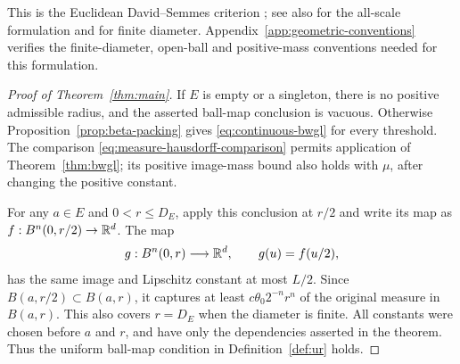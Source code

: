 This is the Euclidean David--Semmes criterion
\cite[Chapter~II.2]{DavidSemmes1993}; see also
\cite[Theorem~2.5]{Tolsa2015Uniform} for the all-scale formulation and
\cite[Theorem~1.0.4]{BateHydeSchul2023} for finite diameter.
Appendix~\ref{app:geometric-conventions} verifies the finite-diameter,
open-ball and positive-mass conventions needed for this formulation.

\begin{proof}[Proof of Theorem~\ref{thm:main}]
If $E$ is empty or a singleton, there is no positive admissible radius,
and the asserted ball-map conclusion is vacuous.  Otherwise
Proposition~\ref{prop:beta-packing} gives
\eqref{eq:continuous-bwgl} for every threshold.  The comparison
\eqref{eq:measure-hausdorff-comparison} permits application of
Theorem~\ref{thm:bwgl}; its positive image-mass bound also holds with
$\mu$, after changing the positive constant.

For any $a\in E$ and $0<r\leq D_E$, apply this conclusion at $r/2$ and
write its map as $f:B^n(0,r/2)\to\mathbb R^d$.  The map
\[
 g:B^n(0,r)\longrightarrow\mathbb R^d,\qquad g(u)=f(u/2),
\]
has the same image and Lipschitz constant at most $L/2$.  Since
$B(a,r/2)\subset B(a,r)$, it captures at least
$c\theta_0 2^{-n}r^n$ of the original measure in $B(a,r)$.
This also covers $r=D_E$ when the diameter is finite.  All constants
were chosen before $a$ and $r$, and have only the dependencies asserted
in the theorem.  Thus the uniform ball-map condition in
Definition~\ref{def:ur} holds.
\end{proof}
